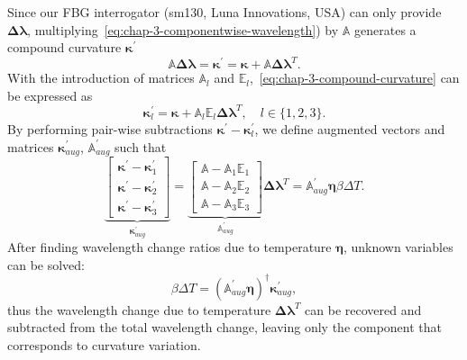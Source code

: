 Since our FBG interrogator (sm130, Luna Innovations, USA) can only provide $\mathbf{\Delta\boldsymbol\lambda}$, multiplying~\cref{eq:chap-3-componentwise-wavelength}) by $\mathbb{A}$ generates a compound curvature $\boldsymbol\kappa^{\prime}$
\begin{equation}
  \label{eq:chap-3-compound-curvature}
  \mathbb{A}\mathbf{\Delta\boldsymbol\lambda} = \boldsymbol\kappa^{\prime} = \boldsymbol\kappa + \mathbb{A}\mathbf{\Delta\boldsymbol\lambda}^T.
\end{equation}
With the introduction of matrices $\mathbb{A}_l$ and $\mathbb{E}_l$,~\cref{eq:chap-3-compound-curvature} can be expressed as
\begin{equation}
  \boldsymbol\kappa^{\prime}_l  =\boldsymbol\kappa + \mathbb{A}_l\mathbb{E}_l\mathbf{\Delta\boldsymbol\lambda}^T, \quad l\in \{1, 2, 3\}.
\end{equation}
By performing pair-wise subtractions $\boldsymbol\kappa^{\prime} - \boldsymbol\kappa^{\prime}_l$, we define augmented vectors and matrices $\boldsymbol{\kappa}^{\prime}_{aug}$, $\mathbb{A}^{\prime}_{aug}$ such that
\begin{equation}
  \label{eq:chap-3-augmented}
  \underbrace{\begin{bmatrix}
    \boldsymbol\kappa^{\prime} - \boldsymbol\kappa^{\prime}_1 \\
    \boldsymbol\kappa^{\prime} - \boldsymbol\kappa^{\prime}_2 \\
    \boldsymbol\kappa^{\prime} - \boldsymbol\kappa^{\prime}_3
  \end{bmatrix}}_{\boldsymbol{\kappa}^{\prime}_{aug}} = \underbrace{\begin{bmatrix}
    \mathbb{A} - \mathbb{A}_1\mathbb{E}_1 \\
    \mathbb{A} - \mathbb{A}_2\mathbb{E}_2 \\
    \mathbb{A} - \mathbb{A}_3\mathbb{E}_3
  \end{bmatrix}}_{\mathbb{A}^{\prime}_{aug}} \mathbf{\Delta\boldsymbol\lambda}^T = \mathbb{A}^{\prime}_{aug}\boldsymbol\eta \beta \Delta T.
\end{equation}
After finding wavelength change ratios due to temperature $\boldsymbol \eta$, unknown variables can be solved:
\begin{equation}
  \label{eq:chap-3-scaled-temperature}
  \beta\Delta T = \left( \mathbb{A}^{\prime}_{aug}\boldsymbol\eta \right)^{\dag}\boldsymbol{\kappa}^{\prime}_{aug},
\end{equation}
thus the wavelength change due to temperature $\mathbf{\Delta\boldsymbol\lambda}^T$ can be recovered and subtracted from the total wavelength change, leaving only the component that corresponds to curvature variation.

